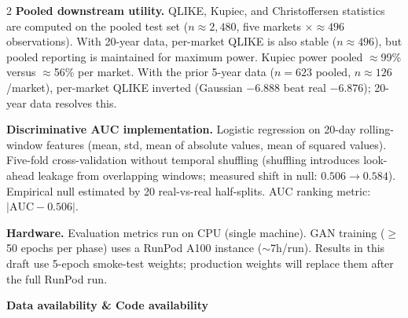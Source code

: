 \documentclass[10pt]{article}
\begin{document}
\begin{multicols}{2}
\textbf{Pooled downstream utility.}
QLIKE, Kupiec, and Christoffersen statistics are computed on the pooled test set ($n\approx2{,}480$, five markets $\times\approx496$ observations). With 20-year data, per-market QLIKE is also stable ($n\approx496$), but pooled reporting is maintained for maximum power. Kupiec power pooled $\approx$99\% versus $\approx$56\% per market. With the prior 5-year data ($n=623$ pooled, $n\approx126$/market), per-market QLIKE inverted (Gaussian $-6.888$ beat real $-6.876$); 20-year data resolves this.

\textbf{Discriminative AUC implementation.}
Logistic regression on 20-day rolling-window features (mean, std, mean of absolute values, mean of squared values). Five-fold cross-validation without temporal shuffling (shuffling introduces look-ahead leakage from overlapping windows; measured shift in null: $0.506 \to 0.584$). Empirical null estimated by 20 real-vs-real half-splits. AUC ranking metric: $|\text{AUC} - 0.506|$.

\textbf{Hardware.} Evaluation metrics run on CPU (single machine). GAN training ($\geq$50 epochs per phase) uses a RunPod A100 instance ($\sim$7h/run). Results in this draft use 5-epoch smoke-test weights; production weights will replace them after the full RunPod run.

\end{multicols}

\clearpage

\begin{tcolorbox}[
  colback=NavyBg, colframe=NavyBg!60!black, arc=4pt,
  left=8pt, right=8pt, top=4pt, bottom=4pt,
  before skip=0pt, after skip=10pt]
{\large\bfseries\color{Navy} Data availability \& Code availability}
\end{tcolorbox}
\end{document}
